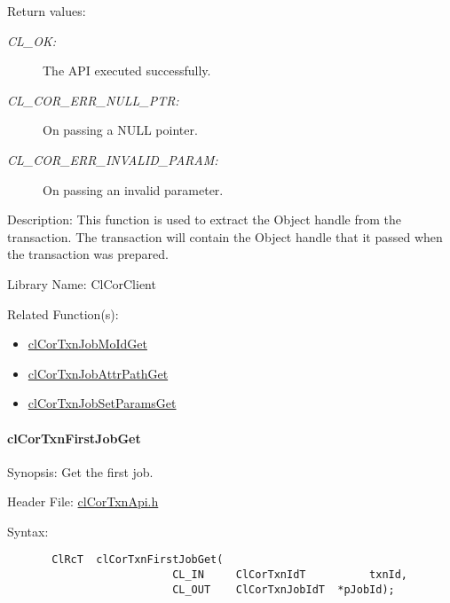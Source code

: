 \begin{Desc}
\item[Return values:]
\begin{description}
\item[{\em CL\_\-OK:}]The API executed successfully. \item[{\em CL\_\-COR\_\-ERR\_\-NULL\_\-PTR:}]On passing a NULL pointer. \item[{\em CL\_\-COR\_\-ERR\_\-INVALID\_\-PARAM:}]On passing an invalid parameter.\end{description}
\end{Desc}
\begin{Desc}
\item[Description:]This function is used to extract the Object handle from the transaction. The transaction will contain the Object handle that it passed when the transaction was prepared.\end{Desc}
\begin{Desc}
\item[Library Name:]Cl\-Cor\-Client\end{Desc}
\begin{Desc}
\item[Related Function(s):]\begin{itemize}
\item \hyperlink{group__group13}{cl\-Cor\-Txn\-Job\-Mo\-Id\-Get} \item \hyperlink{group__group13}{cl\-Cor\-Txn\-Job\-Attr\-Path\-Get} \item \hyperlink{group__group13}{cl\-Cor\-Txn\-Job\-Set\-Params\-Get} \end{itemize}
\end{Desc}
\hypertarget{pagecor512}{}\paragraph{cl\-Cor\-Txn\-First\-Job\-Get}\label{pagecor512}
\begin{Desc}
\item[Synopsis:]Get the first job.\end{Desc}
\begin{Desc}
\item[Header File:]\hyperlink{cl_cor_txn_api_8h}{cl\-Cor\-Txn\-Api.h}\end{Desc}
\begin{Desc}
\item[Syntax:]

\footnotesize\begin{verbatim}       ClRcT  clCorTxnFirstJobGet(
                          CL_IN     ClCorTxnIdT          txnId,
                          CL_OUT    ClCorTxnJobIdT  *pJobId);
\end{verbatim}
\normalsize
\end{Desc}
